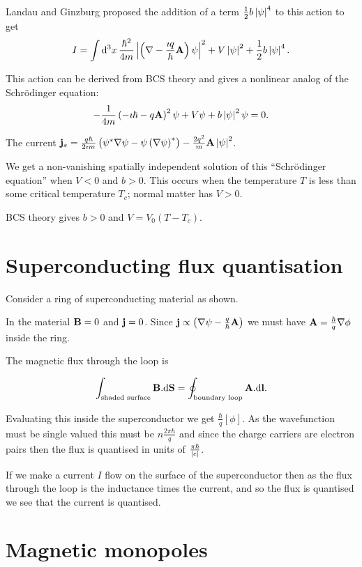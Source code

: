 \documentclass{notes}
\newcommand{\B}{\vect{B}}
\newcommand{\jc}{\vect{j}}
\begin{document}
Landau and Ginzburg proposed the addition of a term
$\frac{1}{2} b \left|\psi\right|^4$ to this action to get
\[
I = \int \mathrm{d}^3 x\, \frac{\hbar^2}{4 m} \left|\left(
\nabla - \frac{\imath q}{\hbar} \mathbf{A}
\right) \psi\right|^2 +
V \left|\psi\right|^2 + \frac{1}{2} b \left|\psi\right|^4.
\]

This action can be derived from BCS theory and gives a nonlinear
analog of the Schr\"odinger equation:
\[
- \frac{1}{4 m} \left( - \imath \hbar - q \mathbf{A}\right)^2  \psi
+ V \psi + b \left|\psi\right|^2 \psi = 0.
\]

The current $\jc_s = \frac{q \hbar}{2 \imath m} \left(
\psi^\ast \nabla \psi - \psi \left( \nabla \psi \right)^\ast
\right) - \frac{2 q^2}{m} \vect{A} \abs{\psi}^2$.

We get a non-vanishing spatially independent solution of this
``Schr\"odinger equation'' when $V < 0$ and $b > 0$.  This
occurs when the temperature $T$ is less than some critical temperature
$T_c$; normal matter has $V > 0$.

BCS theory gives $b > 0$ and $V = V_0 \left( T - T_c \right)$.

\section{Superconducting flux quantisation}

Consider a ring of superconducting material as shown.

\vspace{1in}

In the material $\B = 0$ and $\jc = 0$.  Since $\jc \propto
\left( \nabla \psi - \frac{q}{\hbar} \vect{A}\right)$ we must have
$\mathbf{A} = \frac{\hbar}{q} \nabla \phi$ inside the ring.

The magnetic flux through the loop is

\[
\int_{\text{shaded surface}} \B.\vect{\ud S}
= \oint_{\text{boundary loop}} \vect{A}.\vect{\ud l}.
\]

Evaluating this inside the superconductor we get
$\frac{\hbar}{q} \left[ \phi \right]$.  As the wavefunction must
be single valued this must be $n \frac{2 \pi \hbar}{q}$ and since
the charge carriers are electron pairs then the flux is quantised in
units of $\frac{\pi \hbar}{\left|e\right|}$.

If we make a current $I$ flow on the surface of the superconductor then
as the flux through the loop is the inductance times the current, and so
the flux is quantised we see that the current is quantised.

\section{Magnetic monopoles}
\end{document}
